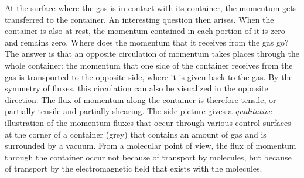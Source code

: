 \documentclass[a4paper,12pt,%
onecolumn,oneside,titlepage,%
british%
]{memoir}
\renewcommand*{\|}[1][]{\nonscript\:#1\vert\nonscript\:\mathopen{}}
\begin{document}
At the surface where the gas is in contact with its container, the momentum gets transferred to the container. An interesting question then arises. When the container is also at rest, the momentum contained in each portion of it is zero and remains zero. Where does the momentum that it receives from the gas go?
%
The answer is that an opposite circulation of momentum takes places through the whole container: the momentum that one side of the container receives from the gas is transported to the opposite side, where it is given back to the gas. By the symmetry of fluxes, this circulation can also be visualized in the opposite direction. The flux of momentum along the container is therefore tensile, or partially tensile and partially shearing. The side picture gives a \emph{qualitative} illustration of the momentum fluxes that occur through various control surfaces at the corner of a container (\textcolor{midgrey}{grey}) that contains an amount of gas and is surrounded by a vacuum. From a molecular point of view, the flux of momentum through the container occur not because of transport by molecules, but because of transport by the electromagnetic field that exists with the molecules.
\end{document}
